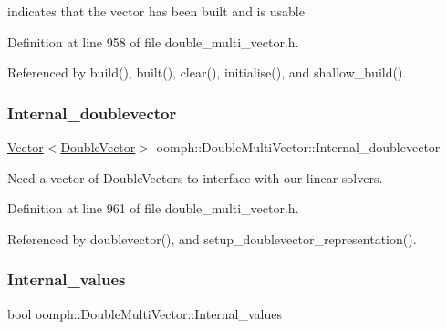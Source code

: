indicates that the vector has been built and is usable 



Definition at line 958 of file double\+\_\+multi\+\_\+vector.\+h.



Referenced by build(), built(), clear(), initialise(), and shallow\+\_\+build().

\mbox{\label{classoomph_1_1DoubleMultiVector_a668c57e389403b0d0c8bafdfa3f66b82}} 
\subsubsection{\texorpdfstring{Internal\+\_\+doublevector}{Internal\_doublevector}}
{\footnotesize\ttfamily \hyperlink{classoomph_1_1Vector}{Vector}$<$\hyperlink{classoomph_1_1DoubleVector}{Double\+Vector}$>$ oomph\+::\+Double\+Multi\+Vector\+::\+Internal\+\_\+doublevector\hspace{0.3cm}{\ttfamily [private]}}



Need a vector of Double\+Vectors to interface with our linear solvers. 



Definition at line 961 of file double\+\_\+multi\+\_\+vector.\+h.



Referenced by doublevector(), and setup\+\_\+doublevector\+\_\+representation().

\mbox{\label{classoomph_1_1DoubleMultiVector_adf8fe4053c07e949f8e9cbea9e29e6e6}} 
\subsubsection{\texorpdfstring{Internal\+\_\+values}{Internal\_values}}
{\footnotesize\ttfamily bool oomph\+::\+Double\+Multi\+Vector\+::\+Internal\+\_\+values\hspace{0.3cm}{\ttfamily [private]}}



